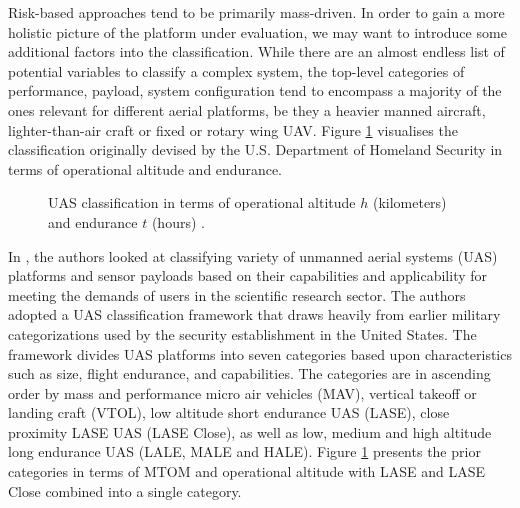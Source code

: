 \documentclass[english, 12pt, a4paper, elec, utf8, a-1b, online]{aaltothesis}
\begin{document}
Risk-based approaches tend to be primarily mass-driven. In order to gain a more holistic picture of the platform under evaluation, we may want to introduce some additional factors into the classification.
While there are an almost endless list of potential variables to classify a complex system, the top-level categories of performance, payload, system configuration tend to encompass a majority of the ones relevant for different aerial platforms, be they a heavier manned aircraft, lighter-than-air craft or fixed or rotary wing UAV.
Figure \ref{fig-3d-dhs-uas-classification} visualises the classification originally devised by the U.S.
Department of Homeland Security in terms of operational altitude and endurance.

\begin{figure}[h]
  \centering
  
  \caption{UAS classification in terms of operational altitude $h$ (kilometers) and endurance $t$ (hours) \cite{watts2012unmanned}.}
  \label{fig-3d-dhs-uas-classification}
\end{figure}

In \cite{watts2012unmanned}, the authors looked at classifying variety of unmanned aerial systems (UAS) platforms and sensor payloads based on their capabilities and applicability for meeting the demands of users in the scientific research sector.
The authors adopted a UAS classification framework that draws heavily from earlier military categorizations used by the security establishment in the United States.
The framework divides UAS platforms into seven categories based upon characteristics such as size, flight endurance, and capabilities.
The categories are in ascending order by mass and performance micro air vehicles (MAV), vertical takeoff or landing craft (VTOL), low altitude short endurance UAS (LASE), close proximity LASE UAS (LASE Close), as well as low, medium and high altitude long endurance UAS (LALE, MALE and HALE).
Figure \ref{fig-3d-dhs-uas-classification} presents the prior categories in terms of MTOM and operational altitude with LASE and LASE Close combined into a single category.
\end{document}
